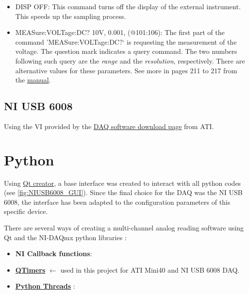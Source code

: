 \documentclass[a4paper]{article}
\begin{document}
{\begin{itemize}
	\item DISP OFF: This command turns off the display of the external instrument. This speeds up the sampling process.
	\item MEASure:VOLTage:DC? 10V, 0.001, (@101:106): The first part of the command 'MEASure:VOLTage:DC$?$` is requesting the measurement of the voltage. The question mark indicates a query command. The two numbers following such query are the \textit{range} and the \textit{resolution}, respectively. There are alternative values for these parameters. See more in pages 211 to 217 from the \hyperref{https://www.manualsbase.com/manual/439362/switch/hp_(hewlett-packard)/hp_34970a/}{category}{name}{manual}.
\end{itemize}

\subsection{NI USB 6008}

Using the VI provided by the \hyperref{https://www.ati-ia.com/products/ft/software/daq_software.aspx}{category}{name}{DAQ software download page} from ATI.


\section{Python}

Using \hyperref{https://www.qt.io/product/development-tools}{category}{name}{Qt creator}, a base interface was created to interact with all python codes (see \autoref{fig:NIUSB6008_GUI}). Since the final choice for the DAQ was the NI USB 6008, the interface has been adapted to the configuration parameters of this specific device.

There are several ways of creating a multi-channel analog reading software using Qt and the NI-DAQmx python libraries \cite{goncalo}:

\begin{itemize}
	\item \textbf{NI Callback functions}: 
	\item \textbf{\hyperref{https://doc.qt.io/qt-6/qtimer.html}{category}{name}{QTimers}} $\leftarrow$ used in this project for ATI Mini40 and NI USB 6008 DAQ.
	\item \textbf{\hyperref{https://realpython.com/intro-to-python-threading/}{category}{name}{Python Threads}} :
\end{itemize}


}
\end{document}

